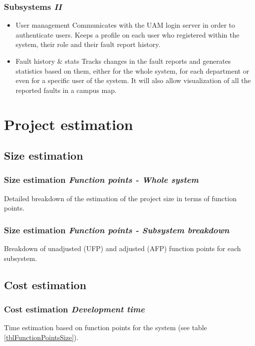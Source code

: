 \documentclass[10pt, compress,usetitleprogressbar,aspectratio=1610]{beamer}
\begin{document}
\begin{frame}
\frametitle{Subsystems \hfill \emph{II}}
\begin{itemize}
\item \alert{User management} Communicates with the UAM login server in order to authenticate users. Keeps a profile on each user who registered within the system, their role and their fault report history.
\item \alert{Fault history \& stats} Tracks changes in the fault reports and generates statistics based on them, either for the whole system, for each department or even for a specific user of the system. It will also allow visualization of all the reported faults in a campus map.
\end{itemize}
\end{frame}

\section{Project estimation}

\subsection{Size estimation}
\begin{frame}
\frametitle{Size estimation \hfill \emph{Function points - Whole system}}
\begin{table}[hbtp]
\centering

\caption{Detailed breakdown of the estimation of the project size in terms of function points.}
\label{tblFunctionPointsSize}
\end{table}
\end{frame}

\begin{frame}
\frametitle{Size estimation \hfill \emph{Function points - Subsystem breakdown}}
\begin{table}[hbtp]
\centering

\caption{Breakdown of unadjusted (UFP) and adjusted (AFP) function points for each subsystem.}
\end{table}
\end{frame}

\subsection{Cost estimation}
\begin{frame}
\frametitle{Cost estimation \hfill \emph{Development time}}
\begin{table}[hbtp]
\centering

\caption{Time estimation based on function points for the system (see table \ref{tblFunctionPointsSize}).}
\label{tblFunctionPointsTime}
\end{table}
\end{frame}
\end{document}
